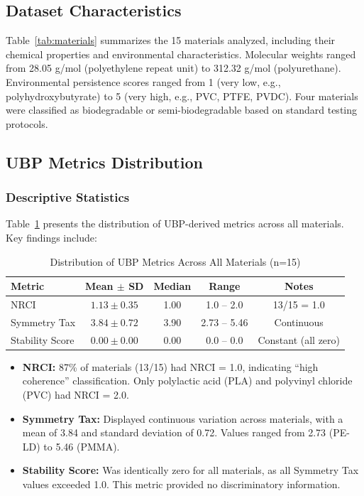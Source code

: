 \documentclass[11pt,letterpaper]{article}
\begin{document}
\subsection{Dataset Characteristics}

Table~\ref{tab:materials} summarizes the 15 materials analyzed, including their chemical properties and environmental characteristics. Molecular weights ranged from 28.05 g/mol (polyethylene repeat unit) to 312.32 g/mol (polyurethane). Environmental persistence scores ranged from 1 (very low, e.g., polyhydroxybutyrate) to 5 (very high, e.g., PVC, PTFE, PVDC). Four materials were classified as biodegradable or semi-biodegradable based on standard testing protocols.

\subsection{UBP Metrics Distribution}

\subsubsection{Descriptive Statistics}
Table~\ref{tab:ubp_metrics} presents the distribution of UBP-derived metrics across all materials. Key findings include:

\begin{table}[h!]
\centering
\caption{Distribution of UBP Metrics Across All Materials (n=15)}
\label{tab:ubp_metrics}
\begin{tabular}{lcccc}
\toprule
\textbf{Metric} & \textbf{Mean $\pm$ SD} & \textbf{Median} & \textbf{Range} & \textbf{Notes} \\
\midrule
NRCI & $1.13 \pm 0.35$ & 1.00 & 1.0 -- 2.0 & 13/15 = 1.0 \\
Symmetry Tax & $3.84 \pm 0.72$ & 3.90 & 2.73 -- 5.46 & Continuous \\
Stability Score & $0.00 \pm 0.00$ & 0.00 & 0.0 -- 0.0 & Constant (all zero) \\
\bottomrule
\end{tabular}
\end{table}

\begin{itemize}
    \item \textbf{NRCI:} 87\% of materials (13/15) had NRCI = 1.0, indicating ``high coherence'' classification. Only polylactic acid (PLA) and polyvinyl chloride (PVC) had NRCI = 2.0.
    \item \textbf{Symmetry Tax:} Displayed continuous variation across materials, with a mean of 3.84 and standard deviation of 0.72. Values ranged from 2.73 (PE-LD) to 5.46 (PMMA).
    \item \textbf{Stability Score:} Was identically zero for all materials, as all Symmetry Tax values exceeded 1.0. This metric provided no discriminatory information.
\end{itemize}
\end{document}

